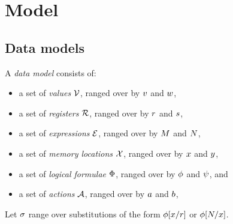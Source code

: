\begin{comment}
https://preshing.com/20131125/acquire-and-release-fences-dont-work-the-way-youd-expect/

Cannot encode R/A actions with actions+fences...

A release operation prevents preceding memory operations from being delayed
past it (a;Rel =/=> Rel;a)
 
A release fence prevents preceding memory operations from being delayed past
subsequent writes (a;FR;w =/=> w;a;FR)

An acquire operation prevents subsequent memory operations from being advanced
before it (Acq;a =/=> a;Acq)

An acquire fence prevents subsequent memory operations from being advanced
before prior reads (r;FA;a =/=> FA;a;r)

https://www.modernescpp.com/index.php/fences-as-memory-barriers

StoreLoad: Full fence allows a store before to be reordered with respect to a
load after (wx;F;ry) ===> (ry;F;wx)

StoreLoad+LoadLoad: Release fence also allows (rx;FR;ry) ===> (ry;FR;rx)

StoreLoad+StoreStore: Acquire fence also allows (wx;FR;wy) ===> (wy;FR;wx)

LoadStore: No fence allows a prior load to reorder w.r.t. a subsequent store
(rx;FR;wy) =/=> (wy;FR;rx)

https://preshing.com/20120710/memory-barriers-are-like-source-control-operations/
Good news is that a fullFence does it.

Bizarrely, it seems this is not supported in C++... You have to go to assembly.
\end{comment}

\section{Model}
\label{sec:model}
\subsection{Data models}
\label{sec:preliminaries}

A \emph{data model} consists of:
\begin{itemize}
\item a set of \emph{values} $\mathcal{V}$, ranged over by
  $v$ and $w$,
\item a set of \emph{registers} $\mathcal{R}$, ranged over by
  $r$ and $s$,
\item a set of \emph{expressions} $\mathcal{E}$, ranged over by
  $M$ and $N$,
\item a set of \emph{memory locations} $\mathcal{X}$, ranged over by
  $x$ and $y$,
\item a set of \emph{logical formulae} $\Phi$, ranged over by
  $\phi$ and $\psi$, and
\item a set of \emph{actions} $\mathcal{A}$, ranged over by $a$ and $b$,
\end{itemize}
Let $\sigma$ range over substitutions of the form $\phi[x/r]$ or $\phi[N/x]$.

